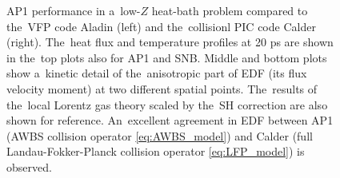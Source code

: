 \documentclass[
 aps,
 jmp,
 amsmath,amssymb,
 twocolumn,
]{revtex4-1}
\newcommand{\Zbar}{Z}
\begin{document}
\begin{figure}[htb]
\begin{center}
  \caption{  
  AP1 performance in a~low-$\Zbar$ heat-bath problem compared to the~VFP code 
  Aladin (left) and the~collisionl PIC code Calder (right). 
  The~heat flux and temperature
  profiles at 20 ps are shown in the~top plots also for AP1 and SNB.
  Middle and bottom plots show a~kinetic detail of the~anisotropic part
  of EDF (its flux velocity moment) at two different spatial points. 
  The~results of the~local Lorentz gas theory scaled by the~SH correction
  are also shown for reference. An~excellent agreement in EDF between
  AP1 (AWBS collision operator \eqref{eq:AWBS_model}) 
  and Calder (full Landau-Fokker-Planck collision operator 
  \eqref{eq:LFP_model}) is observed.
  }
  \label{fig:C7_AladinCalder_case5}
  \end{center} 
\end{figure}
\end{document}
